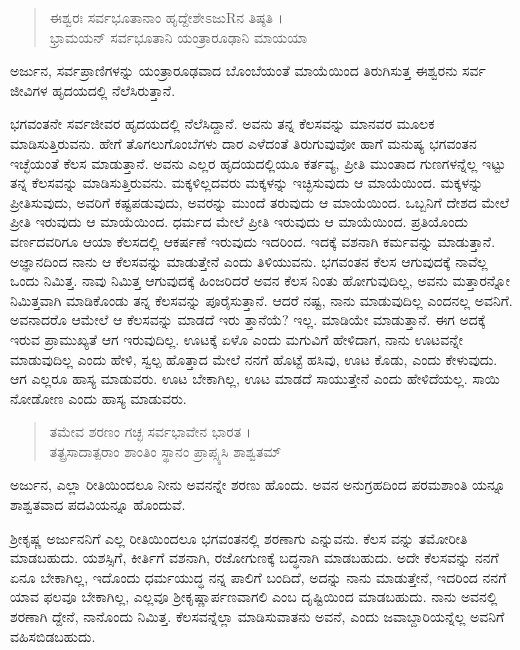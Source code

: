 \begin{verse}
ಈಶ್ವರಃ ಸರ್ವಭೂತಾನಾಂ ಹೃದ್ದೇಶೇಽಜುRನ ತಿಷ್ಠತಿ ।\\ಭ್ರಾಮಯನ್ ಸರ್ವಭೂತಾನಿ ಯಂತ್ರಾರೂಢಾನಿ ಮಾಯಯಾ 
\end{verse}

{\small ಅರ್ಜುನ, ಸರ್ವಪ್ರಾಣಿಗಳನ್ನು ಯಂತ್ರಾರೂಢವಾದ ಬೊಂಬೆಯಂತೆ ಮಾಯೆಯಿಂದ ತಿರುಗಿಸುತ್ತ ಈಶ್ವರನು ಸರ್ವ ಜೀವಿಗಳ ಹೃದಯದಲ್ಲಿ ನೆಲೆಸಿರುತ್ತಾನೆ.}

ಭಗವಂತನೇ ಸರ್ವಜೀವರ ಹೃದಯದಲ್ಲಿ ನೆಲೆಸಿದ್ದಾನೆ. ಅವನು ತನ್ನ ಕೆಲಸವನ್ನು ಮಾನವರ ಮೂಲಕ ಮಾಡಿಸುತ್ತಿರುವನು. ಹೇಗೆ ತೊಗಲುಗೊಂಬೆಗಳು ದಾರ ಎಳೆದಂತೆ ತಿರುಗುವುವೋ ಹಾಗೆ ಮನುಷ್ಯ ಭಗವಂತನ ಇಚ್ಛೆಯಂತೆ ಕೆಲಸ ಮಾಡುತ್ತಾನೆ. ಅವನು ಎಲ್ಲರ ಹೃದಯದಲ್ಲಿಯೂ ಕರ್ತವ್ಯ, ಪ್ರೀತಿ ಮುಂತಾದ ಗುಣಗಳನ್ನೆಲ್ಲ ಇಟ್ಟು ತನ್ನ ಕೆಲಸವನ್ನು ಮಾಡಿಸುತ್ತಿರುವನು. ಮಕ್ಕಳಿಲ್ಲದವರು ಮಕ್ಕಳನ್ನು ಇಚ್ಛಿಸುವುದು ಆ ಮಾಯೆಯಿಂದ. ಮಕ್ಕಳನ್ನು ಪ್ರೀತಿಸುವುದು, ಅವರಿಗೆ ಕಷ್ಟಪಡುವುದು, ಅವರನ್ನು ಮುಂದೆ ತರುವುದು ಆ ಮಾಯೆಯಿಂದ. ಒಬ್ಬನಿಗೆ ದೇಶದ ಮೇಲೆ ಪ್ರೀತಿ ಇರುವುದು ಆ ಮಾಯೆಯಿಂದ. ಧರ್ಮದ ಮೇಲೆ ಪ್ರೀತಿ ಇರುವುದು ಆ ಮಾಯೆಯಿಂದ. ಪ್ರತಿಯೊಂದು ವರ್ಣದವರಿಗೂ ಆಯಾ ಕೆಲಸದಲ್ಲಿ ಆಕರ್ಷಣೆ ಇರುವುದು ಇದರಿಂದ. ಇದಕ್ಕೆ ವಶನಾಗಿ ಕರ್ಮವನ್ನು ಮಾಡುತ್ತಾನೆ. ಅಜ್ಞಾನದಿಂದ ನಾನು ಆ ಕೆಲಸವನ್ನು ಮಾಡುತ್ತೇನೆ ಎಂದು ತಿಳಿಯುವನು. ಭಗವಂತನ ಕೆಲಸ ಆಗುವುದಕ್ಕೆ ನಾವೆಲ್ಲ ಒಂದು ನಿಮಿತ್ತ. ನಾವು ನಿಮಿತ್ತ ಆಗುವುದಕ್ಕೆ ಹಿಂಜರಿದರೆ ಅವನ ಕೆಲಸ ನಿಂತು ಹೋಗುವುದಿಲ್ಲ, ಅವನು ಮತ್ತಾರನ್ನೋ ನಿಮಿತ್ತವಾಗಿ ಮಾಡಿಕೊಂಡು ತನ್ನ ಕೆಲಸವನ್ನು ಪೂರೈಸುತ್ತಾನೆ. ಆದರೆ ನಷ್ಟ, ನಾನು ಮಾಡುವುದಿಲ್ಲ ಎಂದನಲ್ಲ ಅವನಿಗೆ. ಅವನಾದರೊ ಆಮೇಲೆ ಆ ಕೆಲಸವನ್ನು ಮಾಡದೆ ಇರು ತ್ತಾನೆಯೆ? ಇಲ್ಲ. ಮಾಡಿಯೇ ಮಾಡುತ್ತಾನೆ. ಈಗ ಅದಕ್ಕೆ ಇರುವ ಪ್ರಾಮುಖ್ಯತೆ ಆಗ ಇರುವುದಿಲ್ಲ. ಊಟಕ್ಕೆ ಏಳೊ ಎಂದು ಮಗುವಿಗೆ ಹೇಳಿದಾಗ, ನಾನು ಊಟವನ್ನೇ ಮಾಡುವುದಿಲ್ಲ ಎಂದು ಹೇಳಿ, ಸ್ವಲ್ಪ ಹೊತ್ತಾದ ಮೇಲೆ ನನಗೆ ಹೊಟ್ಟೆ ಹಸಿವು, ಊಟ ಕೊಡು, ಎಂದು ಕೇಳುವುದು. ಆಗ ಎಲ್ಲರೂ ಹಾಸ್ಯ ಮಾಡುವರು. ಊಟ ಬೇಕಾಗಿಲ್ಲ, ಊಟ ಮಾಡದೆ ಸಾಯುತ್ತೇನೆ ಎಂದು ಹೇಳಿದೆಯಲ್ಲ. ಸಾಯಿ ನೋಡೋಣ ಎಂದು ಹಾಸ್ಯ ಮಾಡುವರು.

\begin{verse}
ತಮೇವ ಶರಣಂ ಗಚ್ಛ ಸರ್ವಭಾವೇನ ಭಾರತ ।\\ತತ್ಪ್ರಸಾದಾತ್ಪರಾಂ ಶಾಂತಿಂ ಸ್ಥಾನಂ ಪ್ರಾಪ್ಸ್ಯಸಿ ಶಾಶ್ವತಮ್ 
\end{verse}

{\small ಅರ್ಜುನ, ಎಲ್ಲಾ ರೀತಿಯಿಂದಲೂ ನೀನು ಅವನನ್ನೇ ಶರಣು ಹೊಂದು. ಅವನ ಅನುಗ್ರಹದಿಂದ ಪರಮಶಾಂತಿ ಯನ್ನೂ ಶಾಶ್ವತವಾದ ಪದವಿಯನ್ನೂ ಹೊಂದುವೆ.}

ಶ್ರೀಕೃಷ್ಣ ಅರ್ಜುನನಿಗೆ ಎಲ್ಲ ರೀತಿಯಿಂದಲೂ ಭಗವಂತನಲ್ಲಿ ಶರಣಾಗು ಎನ್ನುವನು. ಕೆಲಸ ವನ್ನು ತಮೋರೀತಿ ಮಾಡಬಹುದು. ಯಶಸ್ಸಿಗೆ, ಕೀರ್ತಿಗೆ ವಶನಾಗಿ, ರಜೋಗುಣಕ್ಕೆ ಬದ್ಧನಾಗಿ ಮಾಡಬಹುದು. ಅದೇ ಕೆಲಸವನ್ನು ನನಗೆ ಏನೂ ಬೇಕಾಗಿಲ್ಲ, ಇದೊಂದು ಧರ್ಮಯುದ್ಧ ನನ್ನ ಪಾಲಿಗೆ ಬಂದಿದೆ, ಅದನ್ನು ನಾನು ಮಾಡುತ್ತೇನೆ, ಇದರಿಂದ ನನಗೆ ಯಾವ ಫಲವೂ ಬೇಕಾಗಿಲ್ಲ, ಎಲ್ಲವೂ ಶ್ರೀಕೃಷ್ಣಾರ್ಪಣವಾಗಲಿ ಎಂಬ ದೃಷ್ಟಿಯಿಂದ ಮಾಡಬಹುದು. ನಾನು ಅವನಲ್ಲಿ ಶರಣಾಗಿ ದ್ದೇನೆ, ನಾನೊಂದು ನಿಮಿತ್ತ. ಕೆಲಸವನ್ನೆಲ್ಲಾ ಮಾಡಿಸುವಾತನು ಅವನೆ, ಎಂದು ಜವಾಬ್ದಾರಿಯನ್ನೆಲ್ಲ ಅವನಿಗೆ ವಹಿಸಬಿಡಬಹುದು.

